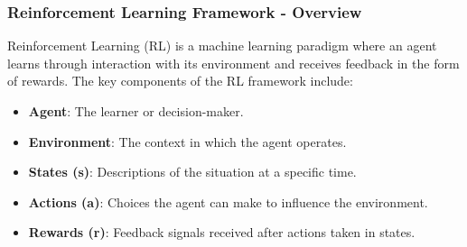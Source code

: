 \documentclass[aspectratio=169]{beamer}
\begin{document}
\begin{frame}[fragile]
    \frametitle{Reinforcement Learning Framework - Overview}
    Reinforcement Learning (RL) is a machine learning paradigm where an agent learns through interaction with its environment and receives feedback in the form of rewards. The key components of the RL framework include:
    \begin{itemize}
        \item \textbf{Agent}: The learner or decision-maker.
        \item \textbf{Environment}: The context in which the agent operates.
        \item \textbf{States (s)}: Descriptions of the situation at a specific time.
        \item \textbf{Actions (a)}: Choices the agent can make to influence the environment.
        \item \textbf{Rewards (r)}: Feedback signals received after actions taken in states.
    \end{itemize}
\end{frame}
\end{document}
